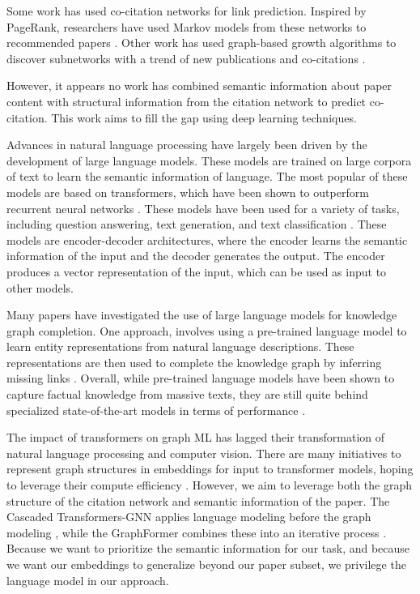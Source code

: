 \documentclass[10pt,twocolumn,letterpaper]{article}
\begin{document}
Some work has used co-citation networks for link prediction. Inspired by PageRank, researchers have used Markov models from these networks to recommended papers \cite{zhu2002using}. Other work has used graph-based growth algorithms to discover subnetworks with a trend of new publications and co-citations \cite{smojver2021exploring}.

However, it appears no work has combined semantic information about paper content with structural information from the citation network to predict co-citation. This work aims to fill the gap using deep learning techniques.

Advances in natural language processing have largely been driven by the development of large language models. These models are trained on large corpora of text to learn the semantic information of language. The most popular of these models are based on transformers, which have been shown to outperform recurrent neural networks \cite{vaswani2017attention}. These models have been used for a variety of tasks, including question answering, text generation, and text classification \cite{devlin2018bert}. These models are encoder-decoder architectures, where the encoder learns the semantic information of the input and the decoder generates the output. The encoder produces a vector representation of the input, which can be used as input to other models. 

Many papers have investigated the use of large language models for knowledge graph completion. One approach, involves using a pre-trained language model to learn entity representations from natural language descriptions. These representations are then used to complete the knowledge graph by inferring missing links \cite{Wang2022SimKGCSC}. Overall, while pre-trained language models have been shown to capture factual knowledge from massive texts, they are still quite behind specialized state-of-the-art models in terms of performance \cite{Lv2022DoPM}.

The impact of transformers on graph ML has lagged their transformation of natural language processing and computer vision. There are many initiatives to represent graph structures in embeddings for input to transformer models, hoping to leverage their compute efficiency \cite{ying2021transformers,kim2022pure}. However, we aim to leverage both the graph structure of the citation network and semantic information of the paper. The Cascaded Transformers-GNN applies language modeling before the graph modeling \cite{hamilton2017inductive}, while the GraphFormer combines these into an iterative process \cite{yang2021graphformers}. Because we want to prioritize the semantic information for our task, and because we want our embeddings to generalize beyond our paper subset, we privilege the language model in our approach.
\end{document}
